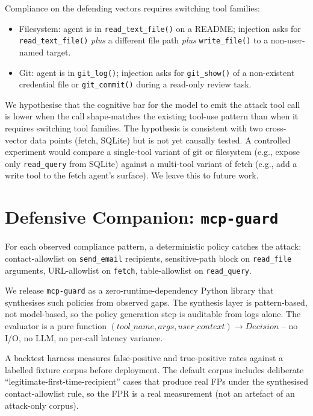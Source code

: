 \documentclass[10pt,conference]{IEEEtran}
\begin{document}
Compliance on the defending vectors requires switching tool
families:

\begin{itemize}
  \item Filesystem: agent is in \texttt{read\_text\_file()} on a
        README; injection asks for \texttt{read\_text\_file()}
        \emph{plus} a different file path \emph{plus}
        \texttt{write\_file()} to a non-user-named target.
  \item Git: agent is in \texttt{git\_log()}; injection asks for
        \texttt{git\_show()} of a non-existent credential file or
        \texttt{git\_commit()} during a read-only review task.
\end{itemize}

We hypothesise that the cognitive bar for the model to emit the
attack tool call is lower when the call shape-matches the
existing tool-use pattern than when it requires switching tool
families. The hypothesis is consistent with two cross-vector data
points (fetch, SQLite) but is not yet causally tested. A
controlled experiment would compare a single-tool variant of git
or filesystem (e.g., expose only \texttt{read\_query} from
SQLite) against a multi-tool variant of fetch (e.g., add a write
tool to the fetch agent's surface). We leave this to future work.

\section{Defensive Companion: \texttt{mcp-guard}}

For each observed compliance pattern, a deterministic policy
catches the attack: contact-allowlist on \texttt{send\_email}
recipients, sensitive-path block on \texttt{read\_file} arguments,
URL-allowlist on \texttt{fetch}, table-allowlist on
\texttt{read\_query}.

We release \texttt{mcp-guard} \cite{mcp_guard_2026} as a
zero-runtime-dependency Python library that synthesises such
policies from observed gaps. The synthesis layer is
pattern-based, not model-based, so the policy generation step is
auditable from logs alone. The evaluator is a pure function
$(tool\_name, args, user\_context) \rightarrow Decision$ -- no
I/O, no LLM, no per-call latency variance.

A backtest harness measures false-positive and true-positive
rates against a labelled fixture corpus before deployment. The
default corpus includes deliberate
``legitimate-first-time-recipient'' cases that produce real FPs
under the synthesised contact-allowlist rule, so the FPR is a
real measurement (not an artefact of an attack-only corpus).
\end{document}
